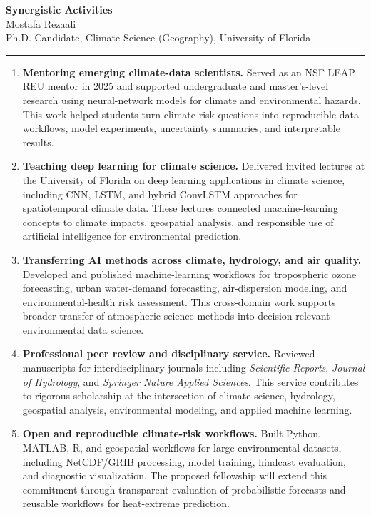 \documentclass[11pt,letterpaper]{article}
\begin{document}
\begin{center}
    {\Large\bfseries Synergistic Activities}\\[0.12cm]
    {\normalsize Mostafa Rezaali}\\[-0.02cm]
    {\small Ph.D. Candidate, Climate Science (Geography), University of Florida}\\[0.08cm]
    \rule{0.62\textwidth}{0.4pt}
\end{center}

\begin{enumerate}
\item \textbf{Mentoring emerging climate-data scientists.}
Served as an NSF LEAP REU mentor in 2025 and supported undergraduate and master's-level research using neural-network models for climate and environmental hazards. This work helped students turn climate-risk questions into reproducible data workflows, model experiments, uncertainty summaries, and interpretable results.

\item \textbf{Teaching deep learning for climate science.}
Delivered invited lectures at the University of Florida on deep learning applications in climate science, including CNN, LSTM, and hybrid ConvLSTM approaches for spatiotemporal climate data. These lectures connected machine-learning concepts to climate impacts, geospatial analysis, and responsible use of artificial intelligence for environmental prediction.

\item \textbf{Transferring AI methods across climate, hydrology, and air quality.}
Developed and published machine-learning workflows for tropospheric ozone forecasting, urban water-demand forecasting, air-dispersion modeling, and environmental-health risk assessment. This cross-domain work supports broader transfer of atmospheric-science methods into decision-relevant environmental data science.

\item \textbf{Professional peer review and disciplinary service.}
Reviewed manuscripts for interdisciplinary journals including \textit{Scientific Reports}, \textit{Journal of Hydrology}, and \textit{Springer Nature Applied Sciences}. This service contributes to rigorous scholarship at the intersection of climate science, hydrology, geospatial analysis, environmental modeling, and applied machine learning.

\item \textbf{Open and reproducible climate-risk workflows.}
Built Python, MATLAB, R, and geospatial workflows for large environmental datasets, including NetCDF/GRIB processing, model training, hindcast evaluation, and diagnostic visualization. The proposed fellowship will extend this commitment through transparent evaluation of probabilistic forecasts and reusable workflows for heat-extreme prediction.
\end{enumerate}
\end{document}
